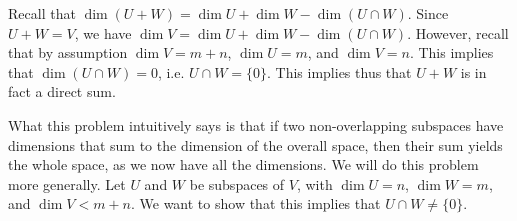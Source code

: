 \documentclass{book}
\begin{document}
\begin{enumerate}[label=\arabic*)]

      Recall that $\dim(U + W) = \dim U + \dim W - \dim(U \cap W)$. Since $U + W = V$, we have $\dim V = \dim U + \dim W - \dim(U \cap W)$.  However, recall that by assumption
      $\dim V = m + n$, $\dim U = m$, and $\dim V = n$. This implies that $\dim(U \cap W) = 0$, i.e. $U \cap W = \{0\}$. This implies thus that $U + W$ is in fact a direct
      sum.

      What this problem intuitively says is that if two non-overlapping subspaces have dimensions that sum to the dimension of the overall space, then their sum yields the
      whole space, as we now have all the dimensions.
    \ii
      We will do this problem more generally. Let $U$ and $W$ be subspaces of $V$, with $\dim U = n$, $\dim W = m$, and $\dim V < m + n$. We want to show that this implies
      that $U \cap W \neq \{0\}$. 
      

\end{enumerate}
\end{document}
